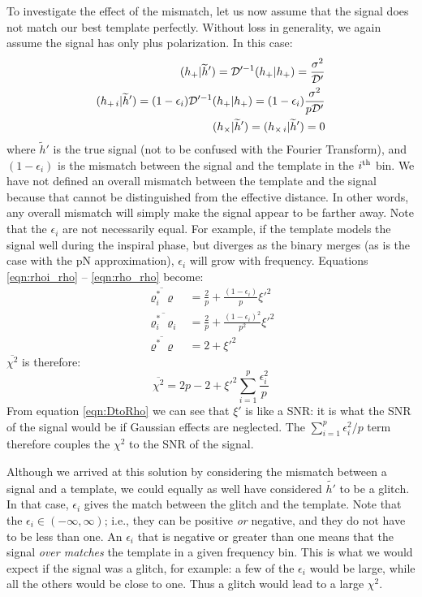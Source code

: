 To investigate the effect of the mismatch, let us now assume that the signal does not match our best template perfectly. Without loss in generality, we again assume the signal has only plus polarization. In this case:
\begin{align}
(h_{+}|\widetilde{h}') = \mathcal{D}'^{-1}(h_{+}|h_{+}) = \frac{\sigma^2}{\mathcal{D}'} \\
(h_{+\,i}|\widetilde{h}') = (1 - \epsilon_i)\mathcal{D}'^{-1}(h_{+}|h_{+}) = (1 - \epsilon_i) \frac{\sigma^2}{p\mathcal{D}'} \\
(h_{\times}|\widetilde{h}') = (h_{\times\,i}|\widetilde{h}') = 0
\end{align}
where $\widetilde{h}'$ is the true signal (not to be confused with the Fourier Transform), and $(1-\epsilon_i)$ is the mismatch between the signal and the template in the $i^{\mathrm{th}}$ bin. We have not defined an overall mismatch between the template and the signal because that cannot be distinguished from the effective distance. In other words, any overall mismatch will simply make the signal appear to be farther away. Note that the $\epsilon_i$ are not necessarily equal. For example, if the template models the signal well during the inspiral phase, but diverges as the binary merges (as is the case with the \ac{pN} approximation), $\epsilon_i$ will grow with frequency. Equations \ref{eqn:rhoi_rho} -- \ref{eqn:rho_rho} become:
\begin{align}
\overline{\varrho_i^{*}\varrho} &= \frac{2}{p} + \frac{(1-\epsilon_i)}{p} \xi'^2 \\
\overline{\varrho_i^{*}\varrho_i} &= \frac{2}{p} + \frac{(1-\epsilon_i)^2}{p^2} \xi'^2 \\
\overline{\varrho^{*}\varrho} &= 2 + \xi'^2
\end{align}
$\overline{\chi^2}$ is therefore:
\begin{equation}
\label{eqn:chisq_mismatch}
\overline{\chi^2} = 2p - 2 + \xi'^2 \sum_{i=1}^{p} \frac{\epsilon_i^2}{p}
\end{equation}
From equation \ref{eqn:DtoRho} we can see that $\xi'$ is like a \ac{SNR}: it is what the \ac{SNR} of the signal would be if Gaussian effects are neglected. The $\sum_{i=1}^{p} \epsilon_i^2/p$ term therefore couples the $\chi^2$ to the \ac{SNR} of the signal.

Although we arrived at this solution by considering the mismatch between a signal and a template, we could equally as well have considered $\widetilde{h'}$ to be a glitch. In that case, $\epsilon_i$ gives the match between the glitch and the template. Note that the $\epsilon_i \in (-\infty,\infty)$; i.e., they can be positive \emph{or} negative, and they do not have to be less than one. An $\epsilon_i$ that is negative or greater than one means that the signal \emph{over matches} the template in a given frequency bin. This is what we would expect if the signal was a glitch, for example: a few of the $\epsilon_i$ would be large, while all the others would be close to one. Thus a glitch would lead to a large $\chi^2$. 

